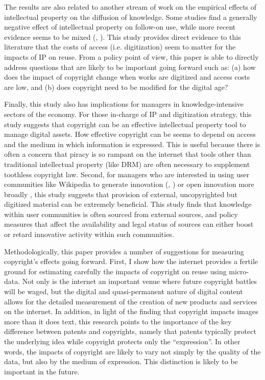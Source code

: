\documentclass[11pt]{article}
\begin{document}
The results are also related to another stream of work on the empirical effects of intellectual property on the diffusion of knowledge. Some studies \citep{murray_formal_2007, murray_mice_2009, williams_intellectual_2013, furman_climbing_2011} find a generally negative effect of intellectual property on follow-on use, while more recent evidence seems to be mixed (\cite{sampat_how_2014}, \cite{galasso_patents_2015}). This study provides direct evidence to this literature that the costs of access (i.e. digitization) seem to matter for the impacts of IP on reuse. From a policy point of view, this paper is able to directly address questions that are likely to be important going forward such as: (a) how does the impact of copyright change when works are digitized and access costs are low, and (b) does copyright need to be modified for the digital age?


Finally, this study also has implications for managers in knowledge-intensive sectors of the economy. For those in-charge of IP and digitization strategy, this study suggests that copyright can be an effective intellectual property tool to manage digital assets. How effective copyright can be seems to depend on access and the medium in which information is expressed. This is useful because there is often a concern that piracy is so rampant on the internet that tools other than traditional intellectual property (like DRM) are often necessary \citep{zhang_intellectual_2014} to supplement toothless copyright law. Second, for managers who are interested in using user communities like Wikipedia to generate innovation (\cite{boudreau_incentives_2011}, \cite{franzoni_crowd_2014}) or open innovation more broadly \citep{fleming_brokerage_2007}, this study suggests that provision of external, uncopyrighted but digitized material can be extremely beneficial. This study finds that knowledge within user communities is often sourced from external sources, and policy measures that affect the availability and legal status of sources can either boost or retard innovative activity within such communities. 

Methodologically, this paper provides a number of suggestions for measuring copyright's effects going forward. First, I show how the internet provides a fertile ground for estimating carefully the impacts of copyright on reuse using micro-data. Not only is the internet an important venue where future copyright battles will be waged, but the digital and quasi-permanent nature of digital content allows for the detailed measurement of the creation of new products and services on the internet. In addition, in light of the finding that copyright impacts images more than it does text, this research points to the importance of the key difference between patents and copyrights, namely that patents typically protect the underlying idea while copyright protects only the ``expression''. In other words, the impacts of copyright are likely to vary not simply by the quality of the data, but also by the medium of expression. This distinction is likely to be important in the future. 
\end{document}
